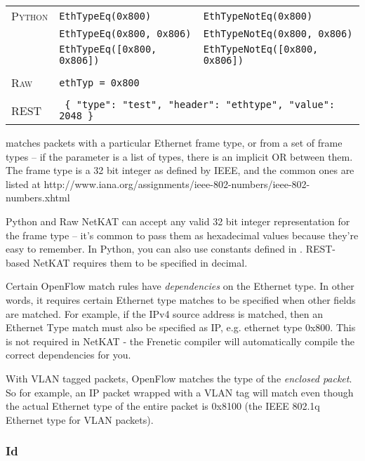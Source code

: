 \bigskip
\begin{tabularx}{\linewidth}{lXX}
\textsc{Python}   & \texttt{EthTypeEq(0x800)}    & \texttt{EthTypeNotEq(0x800)} \\
    & \texttt{EthTypeEq(0x800, 0x806)}  & \texttt{EthTypeNotEq(0x800, 0x806)} \\
    & \texttt{EthTypeEq([0x800, 0x806])}  & \texttt{EthTypeNotEq([0x800, 0x806])} \\ \\
\textsc{Raw}    & \texttt{ethTyp = 0x800}     & \\ \\
\textsc{REST} & \multicolumn{2}{l}{\texttt{ \{ "type": "test", "header": "ethtype", "value": 2048 \} }} 
\end{tabularx}

 matches packets with a particular Ethernet frame type, or from a set of frame types -- if the
parameter is a list of types, there is an implicit OR between them.  The frame type is a 32 bit 
integer as defined by IEEE, and the common ones are listed at 
http://www.iana.org/assignments/ieee-802-numbers/ieee-802-numbers.xhtml

Python and Raw NetKAT can accept any valid 32 bit integer representation for the frame type -- it's common to pass them
as hexadecimal values because they're easy to remember.  In Python, you can also use constants defined in 
.  REST-based NetKAT requires them to be specified in
decimal.

Certain OpenFlow match rules have \emph{dependencies} on the Ethernet type.  
In other words, it requires certain Ethernet type matches to be specified when other fields are matched.  For 
example, if the IPv4 source address is matched, then an Ethernet Type match must also be specified as 
IP, e.g. ethernet type 0x800.  This is not required in NetKAT - the Frenetic compiler will 
automatically compile the correct dependencies for you. 

With VLAN tagged packets, OpenFlow matches the
type of the \emph{enclosed packet}.  So for example, an IP packet wrapped with a VLAN tag will match 
 even though the actual Ethernet type of the entire packet is 0x8100 (the 
IEEE 802.1q Ethernet type for VLAN packets).  

\subsubsection{Id}

